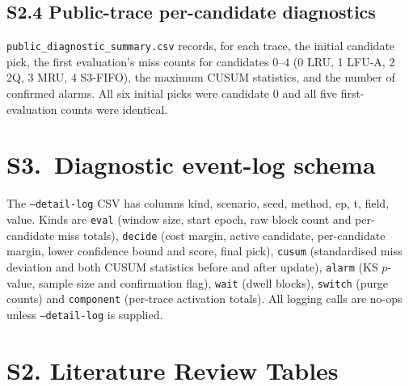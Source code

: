 \documentclass[journal,onecolumn]{IEEEtran}
\begin{document}
\subsection{S2.4 Public-trace per-candidate diagnostics}
\texttt{public\_diagnostic\_summary.csv} records, for each trace, the initial
candidate pick, the first evaluation's miss counts for candidates 0--4
(0 LRU, 1 LFU-A, 2 2Q, 3 MRU, 4 S3-FIFO), the maximum CUSUM statistics, and the
number of confirmed alarms. All six initial picks were candidate 0 and all
five first-evaluation counts were identical.

\section{S3.\ Diagnostic event-log schema}
The \texttt{--detail-log} CSV has columns kind, scenario, seed, method, ep, t,
field, value. Kinds are \texttt{eval} (window size, start epoch, raw block
count and per-candidate miss totals), \texttt{decide} (cost margin, active
candidate, per-candidate margin, lower confidence bound and score, final pick),
\texttt{cusum} (standardised miss deviation and both CUSUM statistics before
and after update), \texttt{alarm} (KS $p$-value, sample size and confirmation
flag), \texttt{wait} (dwell blocks), \texttt{switch} (purge counts) and
\texttt{component} (per-trace activation totals). All logging calls are
no-ops unless \texttt{--detail-log} is supplied.

\section{S2. Literature Review Tables}
\end{document}
